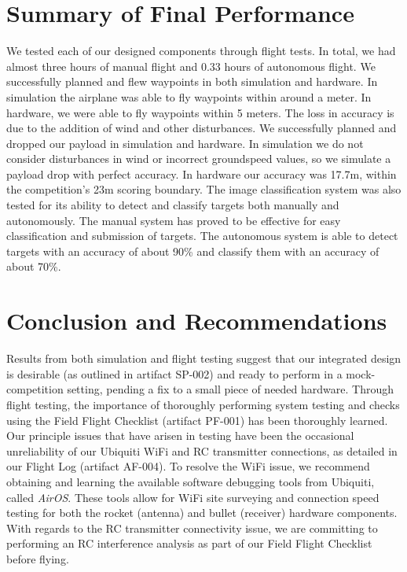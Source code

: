 \documentclass[]{auvsi_doc}
\begin{document}
\section{Summary of Final Performance}

We tested each of our designed components through flight tests. In total, we had almost three hours of manual flight and 0.33 hours of autonomous flight. We successfully planned and flew waypoints in both simulation and hardware. In simulation the airplane was able to fly waypoints within around a meter. In hardware, we were able to fly waypoints within 5 meters. The loss in accuracy is due to the addition of wind and other disturbances. We successfully planned and dropped our payload in simulation and hardware. In simulation we do not consider disturbances in wind or incorrect groundspeed values, so we simulate a payload drop with perfect accuracy. In hardware our accuracy was 17.7m, within the competition's 23m scoring boundary. The image classification system was also tested for its ability to detect and classify targets both manually and autonomously. The manual system has proved to be effective for easy classification and submission of targets. The autonomous system is able to detect targets with an accuracy of about 90\% and classify them with an accuracy of about 70\%.


\section{Conclusion and Recommendations}

Results from both simulation and flight testing suggest that our integrated design is desirable (as outlined in artifact SP-002) and ready to perform in a mock-competition setting, pending a fix to a small piece of needed hardware. Through flight testing, the importance of thoroughly performing system testing and checks using the Field Flight Checklist (artifact PF-001) has been thoroughly learned. Our principle issues that have arisen in testing have been the occasional unreliability of our Ubiquiti WiFi and RC transmitter connections, as detailed in our Flight Log (artifact AF-004). To resolve the WiFi issue, we recommend obtaining and learning the available software debugging tools from Ubiquiti, called \textit{AirOS}. These tools allow for WiFi site surveying and connection speed testing for both the rocket (antenna) and bullet (receiver) hardware components. With regards to the RC transmitter connectivity issue, we are committing to performing an RC interference analysis as part of our Field Flight Checklist before flying.
\end{document}

